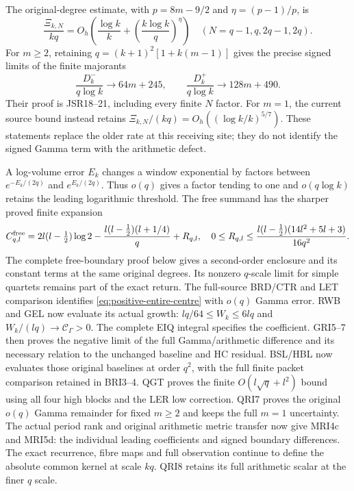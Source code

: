 \documentclass[11pt,a4paper]{article}
\begin{document}
The original-degree estimate, with $p=8m-9/2$ and
$\eta=(p-1)/p$, is
\begin{equation}
 \frac{\Xi_{k,N}}{kq}
 =O_h\!\left(\frac{\log k}{k}
                  +\left(\frac{k\log k}{q}\right)^\eta\right)
 \quad(N=q-1,q,2q-1,2q).
\end{equation}
For $m\ge2$, retaining $q=(k+1)^2[1+k(m-1)]$ gives the precise
signed limits of the finite majorants
\begin{equation}
 \frac{D_k^-}{q\log k}\longrightarrow64m+245,
 \qquad \frac{D_k^+}{q\log k}\longrightarrow128m+490.
\end{equation}
Their proof is JSR18--21, including every finite $N$ factor.
For $m=1$, the current source bound instead retains
$\Xi_{k,N}/(kq)=O_h((\log k/k)^{5/7})$.
These statements replace the older rate at this receiving site;
they do not identify the signed Gamma term with the arithmetic defect.

A log-volume error $E_k$ changes a window exponential by factors
between $e^{-E_k/(2q)}$ and $e^{E_k/(2q)}$. Thus $o(q)$ gives a
factor tending to one and $o(q\log k)$ retains the leading logarithmic
threshold. The free summand has the sharper proved finite expansion
\begin{equation}
 C_{q,l}^{\rm free}=2l(l-\tfrac12)\log2
 -\frac{l(l-\tfrac12)(l+1/4)}q+R_{q,l},\quad
 0\le R_{q,l}\le\frac{l(l-\tfrac12)(14l^2+5l+3)}{16q^2}.
\end{equation}
The complete free-boundary proof below gives a second-order enclosure
and its constant terms at the same original degrees. Its nonzero
$q$-scale limit for simple quartets remains part of the exact return.
The full-source BRD/CTR and LET comparison identifies
\eqref{eq:positive-entire-centre} with $o(q)$ Gamma error.
RWB and GEL now evaluate its actual growth:
$lq/64\leq W_k\leq6lq$ and $W_k/(lq)\to\mathcal C_\Gamma>0$.
The complete EIQ integral specifies the coefficient. GRI5--7
then proves the negative limit of the full Gamma/arithmetic
difference and its necessary relation to the unchanged baseline
and HC residual. BSL/HBL now evaluates those original baselines at order $q^2$,
with the full finite packet comparison retained in BRI3--4.
QGT proves the finite $O(l\sqrt q+l^2)$ bound using all four
high blocks and the LER low correction. QRI7 proves the original
$o(q)$ Gamma remainder for fixed $m\ge2$ and keeps the full
$m=1$ uncertainty. The actual period rank and original arithmetic
metric transfer now give MRI4c and MRI5d: the individual leading
coefficients and signed boundary differences. The exact recurrence,
fibre maps and full observation continue to define the absolute
common kernel at scale $kq$. QRI8 retains its full arithmetic scalar
at the finer $q$ scale.
\end{document}
